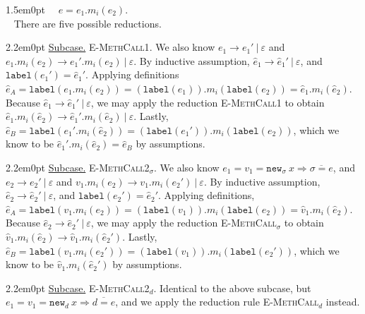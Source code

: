 \documentclass{llncs}
\newcommand{\keywadj}[1]{\mathtt{#1}}
\newcommand{\proofcase}[2]{
	\begin{adjustwidth}{1.5em}{0pt}
		\fbox{Case.}~~#1. \\ ~#2
	\end{adjustwidth}
}
\newcommand{\subcase}[1] {
	\begin{adjustwidth}{2.2em}{0pt}
		\underline{Subcase.} #1
	\end{adjustwidth}
}
\newcommand{\newd}[0]{
	\keywadj{new}_d~x \Rightarrow \overline{d = e}
}
\newcommand{\newsig}[0]{
	\keywadj{new}_\sigma~x \Rightarrow \overline{\sigma = e}
}
\begin{document}
{{{}
}
	
\proofcase{$e=e_1.m_i(e_2)$}{
\noindent
There are five possible reductions. \\

\subcase{ \textsc{E-MethCall1}. We also know $e_1 \longrightarrow e_1'~|~\varepsilon$ and $e_1.m_i(e_2) \longrightarrow e_1'.m_i(e_2)~|~\varepsilon$. By inductive assumption, $\hat e_1 \longrightarrow \hat e_1'~|~\varepsilon$, and $\keywadj{label}(e_1') = \hat e_1'$. Applying definitions $\hat e_A = \keywadj{label}(e_1.m_i(e_2)) = (\keywadj{label}(e_1)).m_i(\keywadj{label}(e_2)) = \hat e_1.m_i(\hat e_2)$. Because $\hat e_1 \longrightarrow \hat e_1'~|~\varepsilon$, we may apply the reduction \textsc{E-MethCall1} to obtain $\hat e_1.m_i(\hat e_2) \longrightarrow \hat e_1'.m_i(\hat e_2)~|~\varepsilon$. Lastly, $\hat e_B = \keywadj{label}(e_1'.m_i(\hat e_2)) = (\keywadj{label}(e_1')).m_i(\keywadj{label}(e_2))$, which we know to be $\hat e_1'.m_i(\hat e_2) = \hat e_B$ by assumptions.\\

}

\subcase{ \textsc{E-MethCall2$_\sigma$}. We also know $e_1 = v_1 = \newsig$, and $e_2 \longrightarrow e_2'~|~\varepsilon$ and $v_1.m_i(e_2) \longrightarrow v_1.m_i(e_2')~|~\varepsilon$. By inductive assumption, $\hat e_2 \longrightarrow \hat e_2'~|~\varepsilon$, and $\keywadj{label}(e_2') = \hat e_2'$. Applying definitions, $\hat e_A = \keywadj{label}(v_1.m_i(e_2)) = (\keywadj{label}(v_1)).m_i(\keywadj{label}(e_2)) = \hat v_1.m_i(\hat e_2)$. Because $\hat e_2 \longrightarrow \hat e_2'~|~\varepsilon$, we may apply the reduction \textsc{E-MethCall$_\sigma$} to obtain $\hat v_1.m_i(\hat e_2) \longrightarrow \hat v_1.m_i(\hat e_2')$. Lastly, $\hat e_B = \keywadj{label}(v_1.m_i(e_2')) = (\keywadj{label}(v_1)).m_i(\keywadj{label}(e_2'))$, which we know to be $\hat v_1.m_i(\hat e_2')$ by assumptions. \\
}

\subcase{ \textsc{E-MethCall2$_d$}. Identical to the above subcase, but $e_1 = v_1 = \newd$, and we apply the reduction rule \textsc{E-MethCall$_d$} instead. 
\\}


}}
\end{document}
